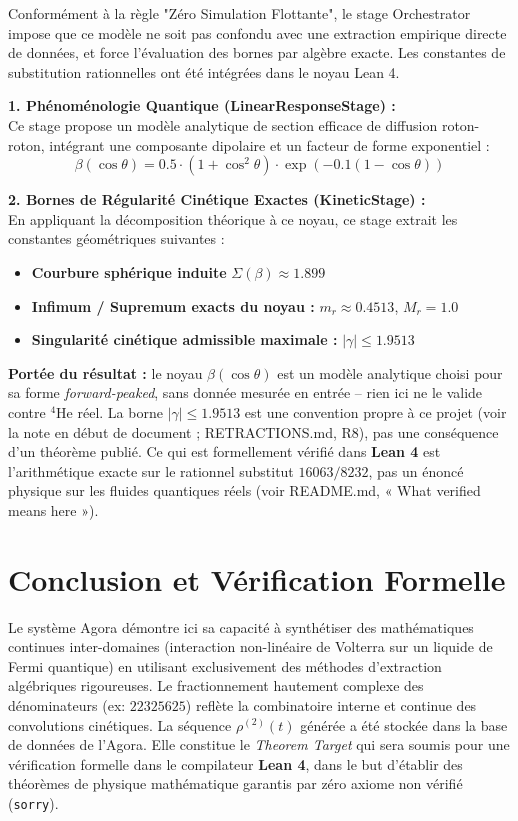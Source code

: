\documentclass[11pt, a4paper]{article}
\newenvironment{mdframed}[1][]{%
  \medskip
  \noindent
  \begin{lrbox}{\mybox}%
  \begin{minipage}{\dimexpr\linewidth-2\fboxsep-2\fboxrule\relax}%
}{%
  \end{minipage}%
  \end{lrbox}%
  \fcolorbox{black}{gray!5}{\usebox{\mybox}}%
  \medskip
}
\begin{document}
Conformément à la règle "Zéro Simulation Flottante", le stage Orchestrator impose que ce modèle ne soit pas confondu avec une extraction empirique directe de données, et force l'évaluation des bornes par algèbre exacte. Les constantes de substitution rationnelles ont été intégrées dans le noyau Lean 4.

\begin{mdframed}[backgroundcolor=gray!5, linecolor=black, linewidth=1pt]
\textbf{1. Phénoménologie Quantique (LinearResponseStage) :}\\
Ce stage propose un modèle analytique de section efficace de diffusion roton-roton, intégrant une composante dipolaire et un facteur de forme exponentiel :
\begin{equation}
\beta(\cos \theta) = 0.5 \cdot \left(1 + \cos^2\theta\right) \cdot \exp\left(-0.1(1 - \cos\theta)\right)
\end{equation}

\vspace{0.3cm}
\textbf{2. Bornes de Régularité Cinétique Exactes (KineticStage) :}\\
En appliquant la décomposition théorique à ce noyau, ce stage extrait les constantes géométriques suivantes :
\begin{itemize}
    \item \textbf{Courbure sphérique induite} $\Sigma(\beta) \approx 1.899$
    \item \textbf{Infimum / Supremum exacts du noyau :} $m_r \approx 0.4513$, $M_r = 1.0$
    \item \textbf{Singularité cinétique admissible maximale :} $|\gamma| \le 1.9513$
\end{itemize}
\end{mdframed}

\textbf{Portée du résultat :} le noyau $\beta(\cos\theta)$ est un modèle analytique choisi pour sa forme \textit{forward-peaked}, sans donnée mesurée en entrée -- rien ici ne le valide contre $^4$He réel. La borne $|\gamma| \le 1.9513$ est une convention propre à ce projet (voir la note en début de document ; RETRACTIONS.md, R8), pas une conséquence d'un théorème publié. Ce qui est formellement vérifié dans \textbf{Lean 4} est l'arithmétique exacte sur le rationnel substitut $16063/8232$, pas un énoncé physique sur les fluides quantiques réels (voir README.md, « What verified means here »).

\section{Conclusion et Vérification Formelle}
Le système Agora démontre ici sa capacité à synthétiser des mathématiques continues inter-domaines (interaction non-linéaire de Volterra sur un liquide de Fermi quantique) en utilisant exclusivement des méthodes d'extraction algébriques rigoureuses. Le fractionnement hautement complexe des dénominateurs (ex: $22325625$) reflète la combinatoire interne et continue des convolutions cinétiques. La séquence $\rho^{(2)}(t)$ générée a été stockée dans la base de données de l'Agora. Elle constitue le \textit{Theorem Target} qui sera soumis pour une vérification formelle dans le compilateur \textbf{Lean 4}, dans le but d'établir des théorèmes de physique mathématique garantis par zéro axiome non vérifié (\texttt{sorry}). 
\end{document}
